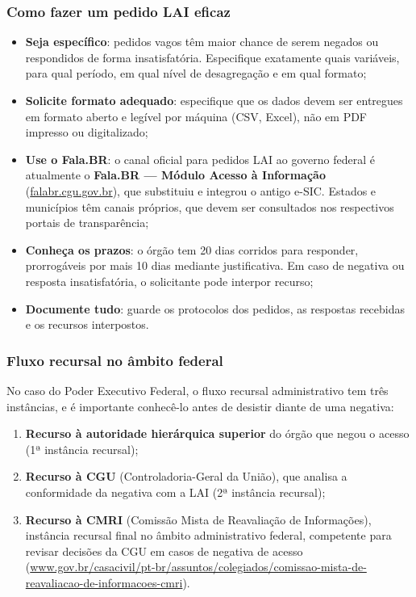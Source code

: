\subsubsection{Como fazer um pedido LAI eficaz}

\begin{itemize}
  \item \textbf{Seja específico}: pedidos vagos têm maior chance de serem negados ou respondidos de forma insatisfatória. Especifique exatamente quais variáveis, para qual período, em qual nível de desagregação e em qual formato;

  \item \textbf{Solicite formato adequado}: especifique que os dados devem ser entregues em formato aberto e legível por máquina (CSV, Excel), não em PDF impresso ou digitalizado;

  \item \textbf{Use o Fala.BR}: o canal oficial para pedidos LAI ao governo federal é atualmente o \textbf{Fala.BR --- Módulo Acesso à Informação} (\url{falabr.cgu.gov.br}), que substituiu e integrou o antigo e-SIC. Estados e municípios têm canais próprios, que devem ser consultados nos respectivos portais de transparência;

  \item \textbf{Conheça os prazos}: o órgão tem 20 dias corridos para responder, prorrogáveis por mais 10 dias mediante justificativa. Em caso de negativa ou resposta insatisfatória, o solicitante pode interpor recurso;

  \item \textbf{Documente tudo}: guarde os protocolos dos pedidos, as respostas recebidas e os recursos interpostos.
\end{itemize}

\subsubsection{Fluxo recursal no âmbito federal}

No caso do Poder Executivo Federal, o fluxo recursal administrativo tem três instâncias, e é importante conhecê-lo antes de desistir diante de uma negativa:

\begin{enumerate}
  \item \textbf{Recurso à autoridade hierárquica superior} do órgão que negou o acesso (1ª instância recursal);
  \item \textbf{Recurso à CGU} (Controladoria-Geral da União), que analisa a conformidade da negativa com a LAI (2ª instância recursal);
  \item \textbf{Recurso à CMRI} (Comissão Mista de Reavaliação de Informações), instância recursal final no âmbito administrativo federal, competente para revisar decisões da CGU em casos de negativa de acesso (\url{www.gov.br/casacivil/pt-br/assuntos/colegiados/comissao-mista-de-reavaliacao-de-informacoes-cmri}).
\end{enumerate}

